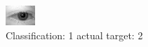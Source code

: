 \begin{figure}[h!]
\begin{center}
\includegraphics[width=0.60\columnwidth]{figures/ID484_class_1_target_2.png}
\end{center}
\caption{ Classification: 1 actual target: 2}
\label{fig:ID484_class_1_target_2}
\end{figure}
